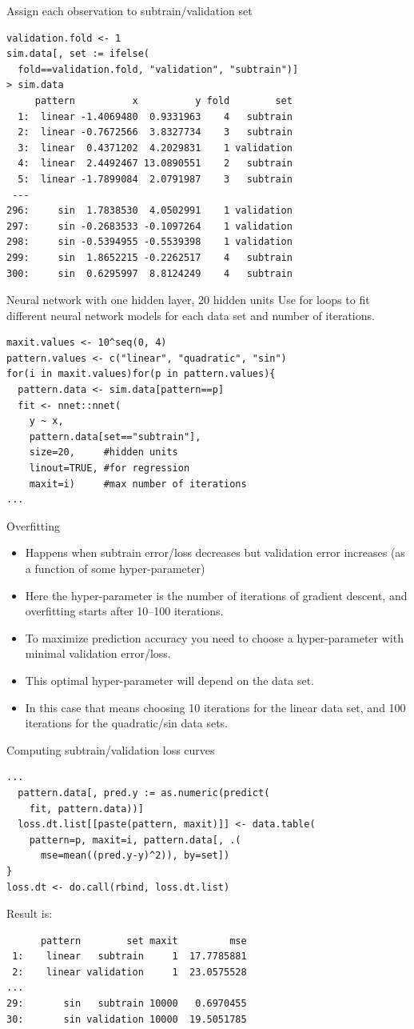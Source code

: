 \documentclass[12pt]{article}
\begin{document}
{Assign each observation to subtrain/validation set}
\begin{verbatim}
validation.fold <- 1
sim.data[, set := ifelse(
  fold==validation.fold, "validation", "subtrain")]
> sim.data
     pattern          x          y fold        set
  1:  linear -1.4069480  0.9331963    4   subtrain
  2:  linear -0.7672566  3.8327734    3   subtrain
  3:  linear  0.4371202  4.2029831    1 validation
  4:  linear  2.4492467 13.0890551    2   subtrain
  5:  linear -1.7899084  2.0791987    3   subtrain
 ---                                              
296:     sin  1.7838530  4.0502991    1 validation
297:     sin -0.2683533 -0.1097264    1 validation
298:     sin -0.5394955 -0.5539398    1 validation
299:     sin  1.8652215 -0.2262517    4   subtrain
300:     sin  0.6295997  8.8124249    4   subtrain
\end{verbatim}

{Neural network with one hidden layer, 20 hidden units}
  Use for loops to fit different neural network models for each data
  set and number of iterations. 
\begin{verbatim}
maxit.values <- 10^seq(0, 4)
pattern.values <- c("linear", "quadratic", "sin")
for(i in maxit.values)for(p in pattern.values){
  pattern.data <- sim.data[pattern==p]
  fit <- nnet::nnet(
    y ~ x,
    pattern.data[set=="subtrain"],
    size=20,     #hidden units
    linout=TRUE, #for regression
    maxit=i)     #max number of iterations
...
\end{verbatim}

  
{Overfitting}
\begin{itemize}
\item Happens when subtrain error/loss decreases but validation error
  increases (as a function of some hyper-parameter)
\item Here the hyper-parameter is the number of iterations of
  gradient descent, and overfitting starts after 10--100 iterations.
\item To maximize prediction accuracy you need to choose a
  hyper-parameter with minimal validation error/loss.
\item This optimal hyper-parameter will depend on the data set.
\item In this case that means choosing 10 iterations for the linear
  data set, and 100 iterations for the quadratic/sin data sets.
\end{itemize}

{Computing subtrain/validation loss curves}
\begin{verbatim}
...
  pattern.data[, pred.y := as.numeric(predict(
    fit, pattern.data))]
  loss.dt.list[[paste(pattern, maxit)]] <- data.table(
    pattern=p, maxit=i, pattern.data[, .(
      mse=mean((pred.y-y)^2)), by=set])
}
loss.dt <- do.call(rbind, loss.dt.list)
\end{verbatim}
Result is:  
\begin{verbatim}
      pattern        set maxit         mse
 1:    linear   subtrain     1  17.7785881
 2:    linear validation     1  23.0575528
...
29:       sin   subtrain 10000   0.6970455
30:       sin validation 10000  19.5051785
\end{verbatim}
\end{document}
